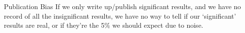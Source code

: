 \documentclass{beamer}
\begin{document}
{ %
    \begin{frame}[plain]
     \end{frame}
}

\begin {frame}{Publication Bias}
If we only write up/publish significant results, and we have no record of all the insignificant results, we have no way to tell if our `significant' results are real, or if they're the 5\% we should expect due to noise.
\end{frame}
\end{document}
